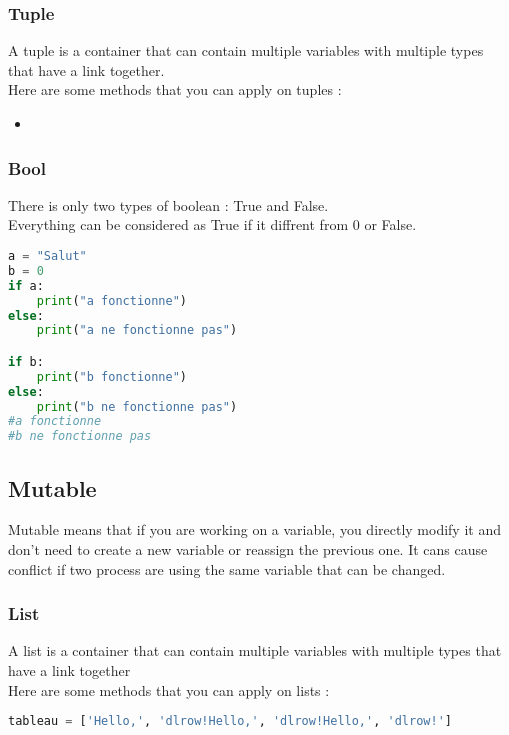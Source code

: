 \documentclass[a4paper, 12pt]{article}
\begin{document}
\subsubsection{Tuple}
A tuple is a container that can contain multiple variables with multiple types that have a link together. \\
Here are some methods that you can apply on tuples : 
\begin{itemize}
\item
\end{itemize}

\subsubsection{Bool}
\label{subsec:Bool}
There is only two types of boolean : True and False. \\
Everything can be considered as True if it diffrent from 0 or False. \\
\begin{lstlisting}[language=Python]
a = "Salut"
b = 0
if a:
	print("a fonctionne")
else:
	print("a ne fonctionne pas")

if b:
	print("b fonctionne")
else:
	print("b ne fonctionne pas")
#a fonctionne
#b ne fonctionne pas
\end{lstlisting}

\subsection{Mutable}
Mutable means that if you are working on a variable, you directly modify it and don't need to create a new variable or reassign the previous one. It cans cause conflict if two process are using the same variable that can be changed.\newline

\subsubsection{List}
A list is a container that can contain multiple variables with multiple types that have a link together\\
Here are some methods that you can apply on lists : 

\begin{lstlisting}[language=Python]
tableau = ['Hello,', 'dlrow!Hello,', 'dlrow!Hello,', 'dlrow!']
\end{lstlisting}
\end{document}
